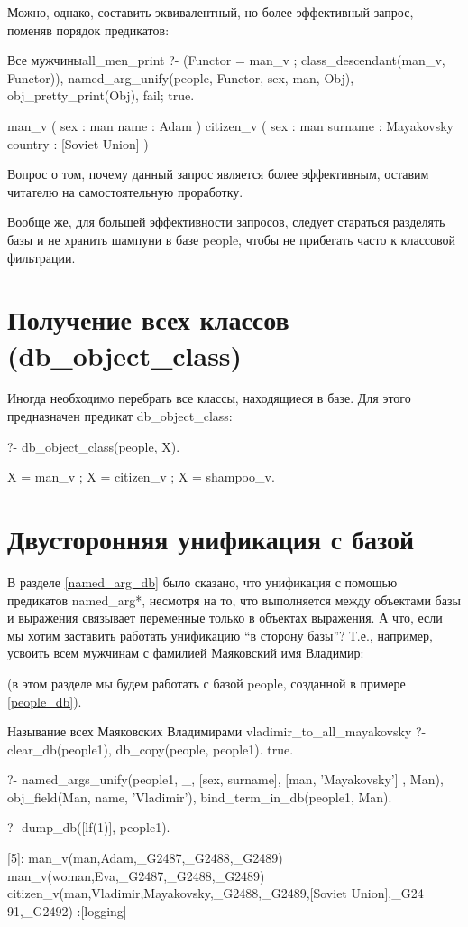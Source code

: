 \documentclass[a4paper]{book}
\def\Te{Т.\thinspace е.}
\def\na{named\_arg*}
\begin{document}
Можно, однако, составить эквивалентный, но более эффективный
запрос, поменяв порядок предикатов:

\begin{example}{Все мужчины}{all_men_print}
?- (Functor = man_v ; class_descendant(man_v, Functor)), 
   named_arg_unify(people, Functor, sex, man, Obj), 
   obj_pretty_print(Obj), fail; true.

man_v ( 
  sex : man 
  name : Adam 
) 
citizen_v ( 
  sex : man 
  surname : Mayakovsky 
  country : [Soviet Union] 
) 
\end{example}

Вопрос о том, почему данный запрос является более эффективным,
оставим читателю на самостоятельную проработку.

Вообще же, для большей эффективности запросов, следует стараться
разделять базы и не хранить шампуни в базе people, чтобы не
прибегать часто к классовой фильтрации.

\section{Получение всех классов (db\_object\_class)}
\label{db_object_class}

Иногда необходимо перебрать все классы, находящиеся в базе. Для
этого предназначен предикат db\_object\_class:

\begin{example}{}{}
?- db_object_class(people, X).

X = man_v ;
X = citizen_v ;
X = shampoo_v.
\end{example}

\section{Двусторонняя унификация с базой}
\label{bind_term_in_db}

В разделе \ref{named_arg_db} было сказано, что унификация с
помощью предикатов \na{}, несмотря на то, что выполняется между
объектами базы и выражения связывает переменные только в объектах
выражения. А что, если мы хотим заставить работать унификацию ``в
сторону базы''? \Te, например, усвоить всем мужчинам с фамилией
Маяковский имя Владимир:

(в этом разделе мы будем работать с базой people, созданной в
примере \ref{people_db}).

\begin{example}{Называние всех Маяковских Владимирами}%
               {vladimir_to_all_mayakovsky}
?- clear_db(people1), db_copy(people, people1).
true.

?- named_args_unify(people1, _, 
      [sex, surname], [man, 'Mayakovsky'] , Man), 
   obj_field(Man, name, 'Vladimir'), 
   bind_term_in_db(people1, Man).

?- dump_db([lf(1)], people1).

[5]: man_v(man,Adam,_G2487,_G2488,_G2489) 
man_v(woman,Eva,_G2487,_G2488,_G2489) 
citizen_v(man,Vladimir,Mayakovsky,_G2488,_G2489,[Soviet Union],_G24
91,_G2492)                                                        
 :[logging]
\end{example}
\end{document}
